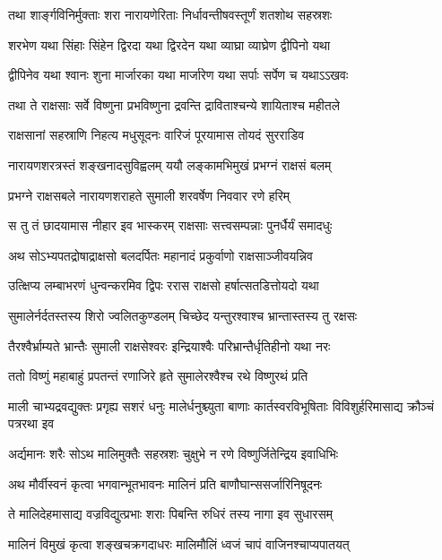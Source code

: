 \twolineshloka
{तथा शार्ङ्गविनिर्मुक्ताः शरा नारायणेरिताः}
{निर्धावन्तीषवस्तूर्णं शतशोथ सहस्रशः} %

\twolineshloka
{शरभेण यथा सिंहाः सिंहेन द्विरदा यथा}
{द्विरदेन यथा व्याघ्रा व्याघ्रेण द्वीपिनो यथा} %

\twolineshloka
{द्वीपिनेव यथा श्वानः शुना मार्जारका यथा}
{मार्जारेण यथा सर्पाः सर्पेण च यथाऽऽखवः} %

\twolineshloka
{तथा ते राक्षसाः सर्वे विष्णुना प्रभविष्णुना}
{द्रवन्ति द्राविताश्चन्ये शायिताश्च महीतले} %

\twolineshloka
{राक्षसानां सहस्राणि निहत्य मधुसूदनः}
{वारिजं पूरयामास तोयदं सुरराडिव} %

\twolineshloka
{नारायणशरत्रस्तं शङ्खनादसुविह्वलम्}
{ययौ लङ्कामभिमुखं प्रभग्नं राक्षसं बलम्} %

\twolineshloka
{प्रभग्ने राक्षसबले नारायणशराहते}
{सुमाली शरवर्षेण निववार रणे हरिम्} %

\twolineshloka
{स तु तं छादयामास नीहार इव भास्करम्}
{राक्षसाः सत्त्वसम्पन्नाः पुनर्धैर्यं समादधुः} %

\twolineshloka
{अथ सोऽभ्यपतद्रोषाद्राक्षसो बलदर्पितः}
{महानादं प्रकुर्वाणो राक्षसाञ्जीवयन्निव} %

\twolineshloka
{उत्क्षिप्य लम्बाभरणं धुन्वन्करमिव द्विपः}
{ररास राक्षसो हर्षात्सतडित्तोयदो यथा} %

\twolineshloka
{सुमालेर्नर्दतस्तस्य शिरो ज्वलितकुण्डलम्}
{चिच्छेद यन्तुरश्वाश्च भ्रान्तास्तस्य तु रक्षसः} %

\twolineshloka
{तैरश्वैर्भ्राम्यते भ्रान्तैः सुमाली राक्षसेश्वरः}
{इन्द्रियाश्वैः परिभ्रान्तैर्धृतिहीनो यथा नरः} %

\twolineshloka
{ततो विष्णुं महाबाहुं प्रपतन्तं रणाजिरे}
{हृते सुमालेरश्वैश्च रथे विष्णुरथं प्रति} %

\threelineshloka
{माली चाभ्यद्रवद्युक्तः प्रगृह्य सशरं धनुः}
{मालेर्धनुश्च्युता बाणाः कार्तस्वरविभूषिताः}
{विविशुर्हरिमासाद्य क्रौञ्चं पत्ररथा इव} %

\twolineshloka
{अर्द्यमानः शरैः सोऽथ मालिमुक्तैः सहस्रशः}
{चुक्षुभे न रणे विष्णुर्जितेन्द्रिय इवाधिभिः} %

\twolineshloka
{अथ मौर्वीस्वनं कृत्वा भगवान्भूतभावनः}
{मालिनं प्रति बाणौघान्ससर्जारिनिषूदनः} %

\twolineshloka
{ते मालिदेहमासाद्य वज्रविद्युत्प्रभाः शराः}
{पिबन्ति रुधिरं तस्य नागा इव सुधारसम्} %

\twolineshloka
{मालिनं विमुखं कृत्वा शङ्खचक्रगदाधरः}
{मालिमौलिं ध्वजं चापं वाजिनश्चाप्यपातयत्} %

